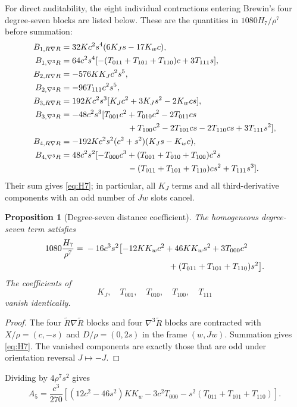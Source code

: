\documentclass[11pt]{amsart}
\numberwithin{equation}{section}
\newtheorem{proposition}[theorem]{Proposition}
\theoremstyle{remark}
\newcommand{\BRiem}{\widetilde{R}}
\begin{document}
For direct auditability, the eight individual contractions entering Brewin's four degree-seven blocks are listed below.  These are the quantities in $1080H_7/\rho^7$ before summation:
\begin{align*}
B_{1,R\nabla R}&=32Kc^2s^4(6K_Js-17K_wc),\\
B_{1,\nabla^3R}&=64c^2s^4[-(T_{011}+T_{101}+T_{110})c+3T_{111}s],\\
B_{2,R\nabla R}&=-576KK_Jc^2s^5,\\
B_{2,\nabla^3R}&=-96T_{111}c^2s^5,\\
B_{3,R\nabla R}&=192Kc^2s^3[K_Jc^2+3K_Js^2-2K_wcs],\\
B_{3,\nabla^3R}&=-48c^2s^3[T_{001}c^2+T_{010}c^2-2T_{011}cs\\
&\hspace{28mm}+T_{100}c^2-2T_{101}cs-2T_{110}cs+3T_{111}s^2],\\
B_{4,R\nabla R}&=-192Kc^2s^2(c^2+s^2)(K_Js-K_wc),\\
B_{4,\nabla^3R}&=48c^2s^2[-T_{000}c^3+(T_{001}+T_{010}+T_{100})c^2s\\
&\hspace{28mm}-(T_{011}+T_{101}+T_{110})cs^2+T_{111}s^3].
\end{align*}
Their sum gives \eqref{eq:H7}; in particular, all $K_J$ terms and all third-derivative components with an odd number of $Jw$ slots cancel.

\begin{proposition}[Degree-seven distance coefficient]\label{prop:H7}
The homogeneous degree-seven term satisfies
\begin{align}
1080\frac{H_7}{\rho^7}
={}&-16c^3s^2\bigl[-12KK_wc^2+46KK_ws^2+3T_{000}c^2\notag\\
&\hspace{35mm}+(T_{011}+T_{101}+T_{110})s^2\bigr].
\label{eq:H7}
\end{align}
The coefficients of
\[
 K_J,\quad T_{001},\quad T_{010},\quad T_{100},\quad T_{111}
\]
vanish identically.
\end{proposition}

\begin{proof}
The four $\BRiem\nabla\BRiem$ blocks and four $\nabla^3\BRiem$ blocks are contracted with $X/\rho=(c,-s)$ and $D/\rho=(0,2s)$ in the frame $(w,Jw)$.  Summation gives \eqref{eq:H7}.  The vanished components are exactly those that are odd under orientation reversal $J\mapsto-J$.
\end{proof}

Dividing by $4\rho^7s^2$ gives
\begin{equation}\label{eq:A5}
 A_5=\frac{c^3}{270}
 \left[(12c^2-46s^2)KK_w-3c^2T_{000}
 -s^2(T_{011}+T_{101}+T_{110})\right].
\end{equation}
\end{document}
